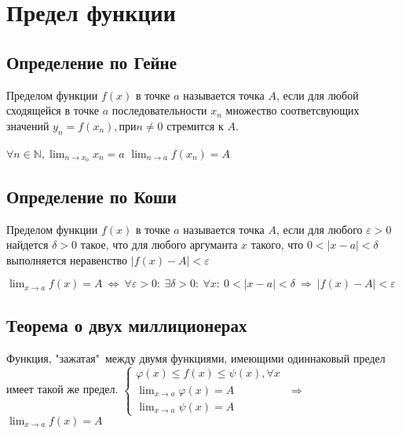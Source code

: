 \chapter{Предел функции}
\section{Определение по Гейне}
Пределом функции $f(x)$ в точке $a$ называется точка $A$, если для любой сходящейся в точке $a$ последовательности $x_n$ множество соответсвующих значений $y_n = f(x_n), при n \neq 0$ стремится к $A$.\newline

$\displaystyle \forall n \in \mathbb{N}, \lim_{n \to x_0} x_n = a$ \newline
$\displaystyle \lim_{n \to a} f(x_n) = A$

\section{Определение по Коши}
Пределом функции $f(x)$ в точке $a$ называется точка $A$, если для любого $\varepsilon > 0$ найдется $\delta > 0$ такое, что для любого аргуманта $x$ такого, что $0 < |x - a| < \delta$ выполняется неравенство $|f(x) - A| < \varepsilon$ \newline

$\displaystyle \lim_{x \to a} f(x) = A \ \Leftrightarrow \ \forall \varepsilon > 0 : \ \exists \delta > 0: \ \forall x : \ 0 < |x - a| < \delta \ \Rightarrow \ |f(x) - A| < \varepsilon $\newline

\section{Теорема о двух миллиционерах}
Функция, "зажатая"\ между двумя функциями, имеющими одиннаковый предел имеет такой же предел.\newline
$\begin{cases}\varphi(x) \leq f(x) \leq \psi(x), \forall x \\ \displaystyle \lim_{x \to a} \varphi(x) = A
\\ \displaystyle \lim_{x \to a} \psi(x) = A\end{cases}$ $\Longrightarrow$ \qquad $\displaystyle \lim_{x \to a} f(x) = A$\newline\newline

